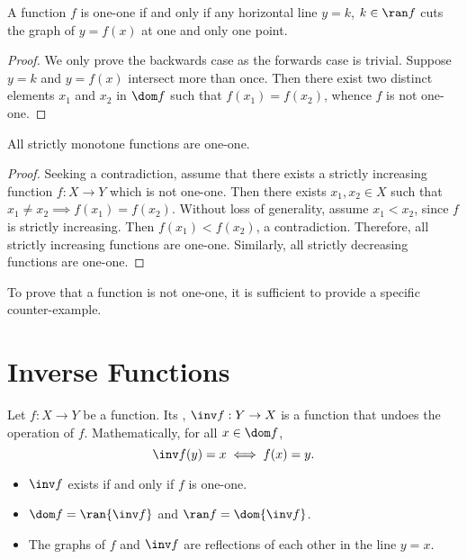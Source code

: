 \begin{proposition}
    A function $f$ is one-one if and only if any horizontal line $y = k$, $k \in \ran f$ cuts the graph of $y = f(x)$ at one and only one point.
\end{proposition}
\begin{proof}
    We only prove the backwards case as the forwards case is trivial. Suppose $y = k$ and $y = f(x)$ intersect more than once. Then there exist two distinct elements $x_1$ and $x_2$ in $\dom f$ such that $f(x_1) = f(x_2)$, whence $f$ is not one-one.
\end{proof}

\begin{proposition}
    All strictly monotone functions are one-one.
\end{proposition}
\begin{proof}
    Seeking a contradiction, assume that there exists a strictly increasing function $f : X \to Y$ which is not one-one. Then there exists $x_1, x_2 \in X$ such that $x_1 \neq x_2 \implies f(x_1) = f(x_2)$. Without loss of generality, assume $x_1 < x_2$, since $f$ is strictly increasing. Then $f(x_1) < f(x_2)$, a contradiction. Therefore, all strictly increasing functions are one-one. Similarly, all strictly decreasing functions are one-one.
\end{proof}

To prove that a function is not one-one, it is sufficient to provide a specific counter-example.

\section{Inverse Functions}

\begin{definition}
    Let $f : X \to Y$ be a function. Its , $\inv f : Y \to X$ is a function that undoes the operation of $f$. Mathematically, for all $x \in \dom f$, \[\inv f(y) = x \iff f(x) = y.\]
\end{definition}

\begin{fact}
    \phantom{.}
    \begin{itemize}
        \item $\inv f$ exists if and only if $f$ is one-one.
        \item $\dom f = \ran{\inv f}$ and $\ran f = \dom{\inv f}$.
        \item The graphs of $f$ and $\inv f$ are reflections of each other in the line $y = x$.
    \end{itemize}
\end{fact}

